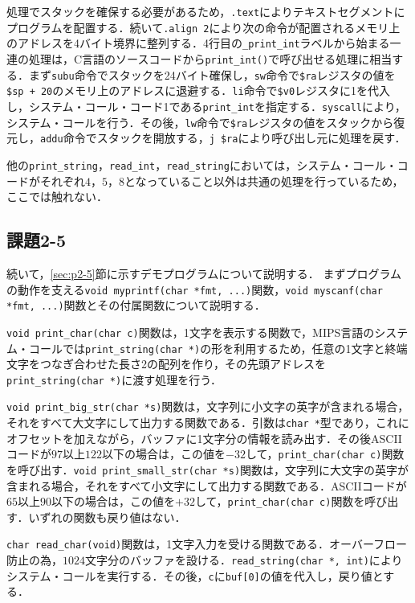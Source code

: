 処理でスタックを確保する必要があるため，\verb|.text|によりテキストセグメントにプログラムを配置する．続いて\verb|.align 2|により次の命令が配置されるメモリ上のアドレスを4バイト境界に整列する．4行目の\verb|_print_int|ラベルから始まる一連の処理は，C言語のソースコードから\verb|print_int()|で呼び出せる処理に相当する．まず\verb|subu|命令でスタックを24バイト確保し，\verb|sw|命令で\verb|$ra|レジスタの値を\verb|$sp + 20|のメモリ上のアドレスに退避する．\verb|li|命令で\verb|$v0|レジスタに1を代入し，システム・コール・コード1である\verb|print_int|を指定する．\verb|syscall|により，システム・コールを行う．その後，\verb|lw|命令で\verb|$ra|レジスタの値をスタックから復元し，\verb|addu|命令でスタックを開放する，\verb|j $ra|により呼び出し元に処理を戻す．

他の\verb|print_string|，\verb|read_int|，\verb|read_string|においては，システム・コール・コードがそれぞれ$4$，$5$，$8$となっていること以外は共通の処理を行っているため，ここでは触れない．



\subsection{課題2-5}
続いて，\ref{sec:p2-5}節に示すデモプログラムについて説明する．
まずプログラムの動作を支える\verb|void myprintf(char *fmt, ...)|関数，\verb|void myscanf(char *fmt, ...)|関数とその付属関数について説明する．

\verb|void print_char(char c)|関数は，1文字を表示する関数で，MIPS言語のシステム・コールでは\verb|print_string(char *)|の形を利用するため，任意の1文字と終端文字をつなぎ合わせた長さ2の配列を作り，その先頭アドレスを\verb|print_string(char *)|に渡す処理を行う．

\verb|void print_big_str(char *s)|関数は，文字列に小文字の英字が含まれる場合，それをすべて大文字にして出力する関数である．引数は\verb|char *|型であり，これにオフセットを加えながら，バッファに1文字分の情報を読み出す．その後ASCIIコードが$97$以上$122$以下の場合は，この値を$-32$して，\verb|print_char(char c)|関数を呼び出す．\verb|void print_small_str(char *s)|関数は，文字列に大文字の英字が含まれる場合，それをすべて小文字にして出力する関数である．ASCIIコードが$65$以上$90$以下の場合は，この値を$+32$して，\verb|print_char(char c)|関数を呼び出す．いずれの関数も戻り値はない．

\verb|char read_char(void)|関数は，1文字入力を受ける関数である．オーバーフロー防止の為，$1024$文字分のバッファを設ける．\verb|read_string(char *, int)|によりシステム・コールを実行する．その後，\verb|c|に\verb|buf[0]|の値を代入し，戻り値とする．

